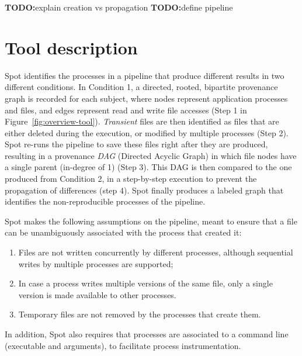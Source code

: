 \documentclass[a4paper,num-refs]{oup-contemporary}
\newcommand{\todo}[1]{\color{red}\textbf{TODO:}#1\color{black}}
\newcommand{\toolname}[0]{Spot\xspace}
\begin{document}
\todo{explain creation vs propagation}
\todo{define pipeline}

\section{Tool description}

\toolname identifies the processes in a pipeline that produce different results in two different conditions.  
In Condition 1, a directed, rooted, bipartite provenance graph is recorded for
each subject, where nodes represent application processes and files, and
edges represent read and write file accesses (Step 1 in Figure~\ref{fig:overview-tool}).
\emph{Transient} files are then identified as
 files that are either deleted during the execution, or modified by
multiple processes (Step 2). \toolname re-runs the pipeline to save these files
right after they are produced, resulting in a provenance \emph{DAG}
(Directed Acyclic Graph) in which file nodes have a single parent (in-degree
of 1) (Step 3). This DAG is then compared to the one produced from
Condition 2, in a step-by-step execution to prevent the propagation of differences (step 4).
\toolname finally produces a labeled graph that identifies the
non-reproducible processes of the pipeline. 

\toolname makes the following assumptions on the pipeline, meant to ensure that 
a file can be unambiguously associated with the process that created it:
\begin{enumerate}
  \item Files are not written concurrently by different processes, although sequential writes by multiple processes are supported;
  \item In case a process writes multiple versions of the same file, only a single version is made available to other processes.
  \item Temporary files are not removed by the processes that create them.
\end{enumerate} 
In addition, \toolname also requires that processes are associated to a
command line (executable and arguments), to facilitate process instrumentation.
\end{document}
